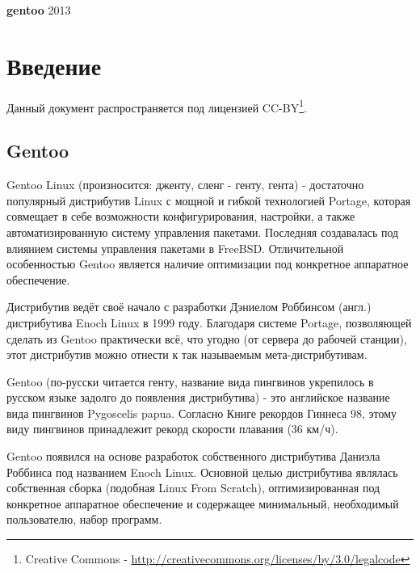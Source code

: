 \documentclass[12pt, a6paper]{article}
\begin{document}
\begin{titlepage}
\begin{center}
\vspace*{10cm}
{ \rm \Huge \textbf
	{
		gentoo
	}
}
\vfill 
{ \rm \large  2013 }
\end{center}
\end{titlepage}

\tableofcontents

\newpage

\section{Введение}

Данный документ распространяется под лицензией CC-BY\footnote{Creative Commons - \href{http://creativecommons.org/licenses/by/3.0/legalcode}{http://creativecommons.org/licenses/by/3.0/legalcode}}.

\subsection{Gentoo}

Gentoo Linux (произносится: дженту, сленг - генту, гента) - достаточно популярный дистрибутив Linux с мощной и гибкой технологией Portage, которая совмещает в себе возможности конфигурирования, настройки, а также автоматизированную систему управления пакетами. Последняя создавалась под влиянием системы управления пакетами в FreeBSD. Отличительной особенностью Gentoo является наличие оптимизации под конкретное аппаратное обеспечение.

Дистрибутив ведёт своё начало с разработки Дэниелом Роббинсом (англ.) дистрибутива Enoch Linux в 1999 году. Благодаря системе Portage, позволяющей сделать из Gentoo практически всё, что угодно (от сервера до рабочей станции), этот дистрибутив можно отнести к так называемым мета-дистрибутивам.

Gentoo (по-русски читается генту, название вида пингвинов укрепилось в русском языке задолго до появления дистрибутива) - это английское название вида пингвинов Pygoscelis papua. Согласно Книге рекордов Гиннеса 98, этому виду пингвинов принадлежит рекорд скорости плавания (36 км/ч).

Gentoo появился на основе разработок собственного дистрибутива Даниэла Роббинса под названием Enoch Linux. Основной целью дистрибутива являлась собственная сборка (подобная Linux From Scratch), оптимизированная под конкретное аппаратное обеспечение и содержащее минимальный, необходимый пользователю, набор программ.
\end{document}
